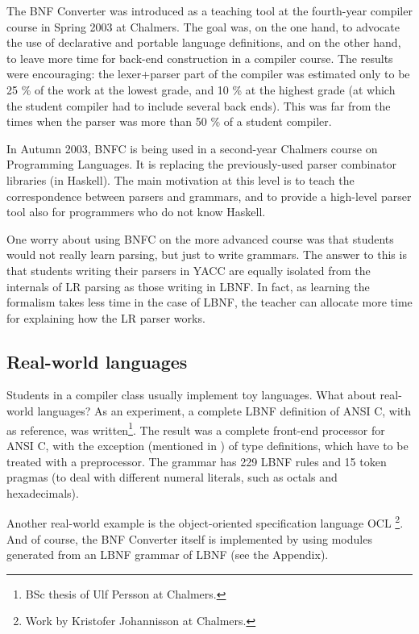 \documentclass{llncs}
\begin{document}
\label{results}

The BNF Converter was introduced as a teaching tool at the 
fourth-year compiler course in Spring 2003 at Chalmers.
The goal was, on the one hand, to advocate the use of declarative
and portable language definitions, and on the other hand, to
leave more time for back-end construction in a compiler course.
The results were encouraging: the lexer+parser part of the compiler 
was estimated only to be 25 \% of the work at the lowest grade, 
and 10 \% at the highest grade (at which the student compiler had to 
include several back ends). This was far from the times 
when the parser was more than 50 \% of a student compiler.

In Autumn 2003, BNFC is being used in a second-year Chalmers course
on Programming Languages. It is replacing the previously-used parser 
combinator libraries (in Haskell).
The main motivation at this level is to teach the correspondence
between parsers and grammars, and to
provide a high-level parser tool also for programmers who do not know Haskell.

One worry about using BNFC on the more advanced course
was that students would not really learn parsing, but just to write grammars. 
The answer to this is that students writing their parsers in YACC 
are equally isolated from the internals of LR parsing as 
those writing in LBNF. In fact, as learning
the formalism takes less time in the case of LBNF, 
the teacher can allocate more
time for explaining how the LR parser works. 



\subsection{Real-world languages}

Students in a compiler class usually implement toy languages.
What about real-world languages?
As an experiment, a complete LBNF definition of
ANSI C, with \cite{Kern88} as reference, was 
written\footnote{
BSc thesis of Ulf Persson at Chalmers.}. 
The result was a complete front-end processor for ANSI C, 
with the exception (mentioned in \cite{Kern88}) of type definitions,
which have to be treated with a preprocessor. The grammar has 229
LBNF rules and 15 token pragmas (to deal with different numeral
literals, such as octals and hexadecimals).

Another real-world example is the
object-oriented specification language OCL \cite{WarmerKleppe99}\footnote{
Work by Kristofer Johannisson at Chalmers.}. 
And of course, the BNF Converter itself is implemented by 
using modules generated from an LBNF grammar of LBNF (see the Appendix).
\end{document}
